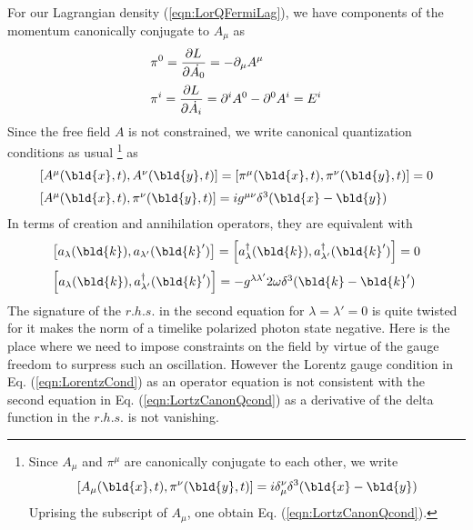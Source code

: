 For our Lagrangian density (\ref{eqn:LorQFermiLag}), we have
components of the momentum canonically conjugate to $A_\mu$ as
\begin{eqnarray}
\begin{array}{l}
\displaystyle
\pi^0 
= 
\frac{\partial L_{}}{\partial \dot{A_0}}
= 
- \partial_\mu A^\mu
\vspace{2mm}
\\
\displaystyle
\pi^i =
\frac{\partial L_{}}
{\partial \dot{A_i}}
=
\partial^i A^0 - \partial^0 A^i
= 
E^i
\end{array}
\end{eqnarray}
Since the free field $A$ is not constrained, we write canonical quantization conditions 
as usual
\footnote{%
Since $A_\mu$ and $\pi^\mu$ are canonically conjugate to each other,
we write
\begin{eqnarray*}
\left[
A_\mu(\bld{x}, t),  \pi^\nu(\bld{y}, t)
\right]
=
i \delta_\mu^{\nu} \delta^3( \bld{x} - \bld{y})
\end{eqnarray*}
Uprising the subscript of $A_\mu$, one obtain
Eq. (\ref{eqn:LortzCanonQcond}).
}%
 as
\begin{eqnarray}
\begin{array}{l}
\left[
A^\mu(\bld{x}, t),  A^\nu(\bld{y}, t)
\right]
=
\left[
\pi^\mu(\bld{x}, t),  \pi^\nu(\bld{y}, t)
\right]
= 0
\vspace{2mm}
\\
\left[
A^\mu(\bld{x}, t),  \pi^\nu(\bld{y}, t)
\right]
=
i g^{\mu \nu} \delta^3( \bld{x} - \bld{y})
\label{eqn:LortzCanonQcond}
\end{array}
\end{eqnarray}
In terms of creation and annihilation operators, they are equivalent with
\begin{eqnarray}
\begin{array}{l}
\left[
a_\lambda(\bld{k}), a_{\lambda'}(\bld{k}')
\right]
=
\left[
a^\dagger_\lambda(\bld{k}), a^\dagger_{\lambda'}(\bld{k}')
\right]
= 0
\vspace{2mm}
\\
\left[
a_\lambda(\bld{k}), a^\dagger_{\lambda'}(\bld{k}')
\right]
=
- g^{\lambda \lambda'} 2\omega \delta^3(\bld{k} - \bld{k}')
\end{array}
\label{eqn:creanncommLorGauge}
\end{eqnarray}
The signature of the $r.h.s.$ in the second equation for $\lambda = \lambda' = 0$
is quite twisted for it makes the norm of a timelike polarized photon state negative.
Here is the place where we need to impose constraints on the field 
by virtue of the gauge freedom to surpress such an oscillation.
However the Lorentz gauge condition in Eq. (\ref{eqn:LorentzCond}) 
as an operator equation is not consistent with the second equation in
Eq. (\ref{eqn:LortzCanonQcond}) as a derivative of the delta function
in the $r.h.s.$ is not vanishing.

